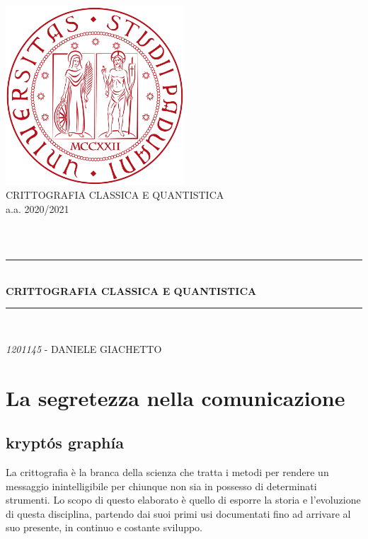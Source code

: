 \documentclass[a4paper, 12pt]{article}
\newcommand{\TITLE}{CRITTOGRAFIA CLASSICA E QUANTISTICA}
\begin{document}
\begin{titlepage}
\begin{center}
\includegraphics[width=0.5\textwidth]{unipd.png}\\

{\large \TITLE{} \\ a.a. 2020/2021}\\[0.5cm]

\begin{tabular}{ll}

\end{tabular}
\\[1.cm]

\rule{\linewidth}{0.5mm} \\[0.4cm]
{ \huge \bfseries \TITLE{} \\[0.4cm] } %

\rule{\linewidth}{0.5mm} \\[1.cm]
\noindent

\vfill
{\large \textit{1201145} - DANIELE GIACHETTO} %
\end{center}
\end{titlepage}

\tableofcontents %
\clearpage %

\pagestyle{fancy}
\section{La segretezza nella comunicazione}
\subsection{kryptós graphía}
La crittografia è la branca della scienza che tratta i metodi per rendere un messaggio inintelligibile per chiunque non sia in possesso di determinati strumenti.\newline
Lo scopo di questo elaborato è quello di esporre la storia e l'evoluzione di questa disciplina, partendo dai suoi primi usi documentati fino ad arrivare al suo presente, in continuo e costante sviluppo.
\end{document}
